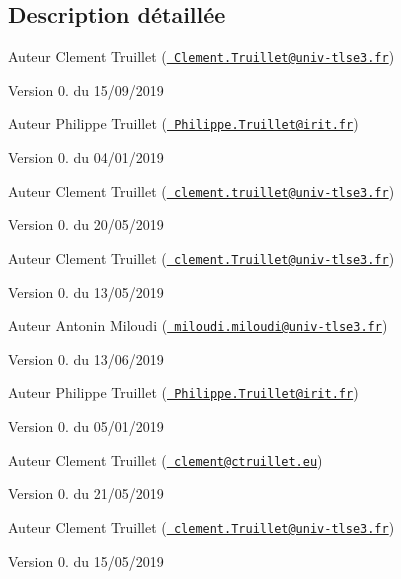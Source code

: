 \subsection{Description détaillée}
\begin{DoxyAuthor}{Auteur}
Clement Truillet (\href{mailto:Clement.Truillet@univ-tlse3.fr}{\texttt{ Clement.\+Truillet@univ-\/tlse3.\+fr}}) 
\end{DoxyAuthor}
\begin{DoxyVersion}{Version}
0. du 15/09/2019
\end{DoxyVersion}
\begin{DoxyAuthor}{Auteur}
Philippe Truillet (\href{mailto:Philippe.Truillet@irit.fr}{\texttt{ Philippe.\+Truillet@irit.\+fr}}) 
\end{DoxyAuthor}
\begin{DoxyVersion}{Version}
0. du 04/01/2019
\end{DoxyVersion}
\begin{DoxyAuthor}{Auteur}
Clement Truillet (\href{mailto:clement.truillet@univ-tlse3.fr}{\texttt{ clement.\+truillet@univ-\/tlse3.\+fr}}) 
\end{DoxyAuthor}
\begin{DoxyVersion}{Version}
0. du 20/05/2019
\end{DoxyVersion}
\begin{DoxyAuthor}{Auteur}
Clement Truillet (\href{mailto:clement.Truillet@univ-tlse3.fr}{\texttt{ clement.\+Truillet@univ-\/tlse3.\+fr}}) 
\end{DoxyAuthor}
\begin{DoxyVersion}{Version}
0. du 13/05/2019
\end{DoxyVersion}
\begin{DoxyAuthor}{Auteur}
Antonin Miloudi (\href{mailto:miloudi.miloudi@univ-tlse3.fr}{\texttt{ miloudi.\+miloudi@univ-\/tlse3.\+fr}}) 
\end{DoxyAuthor}
\begin{DoxyVersion}{Version}
0. du 13/06/2019
\end{DoxyVersion}
\begin{DoxyAuthor}{Auteur}
Philippe Truillet (\href{mailto:Philippe.Truillet@irit.fr}{\texttt{ Philippe.\+Truillet@irit.\+fr}}) 
\end{DoxyAuthor}
\begin{DoxyVersion}{Version}
0. du 05/01/2019
\end{DoxyVersion}
\begin{DoxyAuthor}{Auteur}
Clement Truillet (\href{mailto:clement@ctruillet.eu}{\texttt{ clement@ctruillet.\+eu}}) 
\end{DoxyAuthor}
\begin{DoxyVersion}{Version}
0. du 21/05/2019
\end{DoxyVersion}
\begin{DoxyAuthor}{Auteur}
Clement Truillet (\href{mailto:clement.Truillet@univ-tlse3.fr}{\texttt{ clement.\+Truillet@univ-\/tlse3.\+fr}}) 
\end{DoxyAuthor}
\begin{DoxyVersion}{Version}
0. du 15/05/2019 
\end{DoxyVersion}
